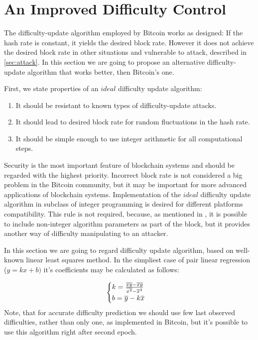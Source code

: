 \documentclass[number,preprint,review]{elsarticle}
\begin{document}
\section{An Improved Difficulty Control}
\label{sec:improved}

The difficulty-update algorithm employed by Bitcoin works as designed: If the hash rate is constant, it yields the desired block rate.
However it does not achieve the desired block rate in other situations and vulnerable to attack, described in \ref{sec:attack}.
In this section we are going to propose an alternative difficulty-update algorithm that works better, then Bitcoin's one.

First, we state properties of an \(ideal\) difficulty update algorithm:
\begin{enumerate}
\item{It should be resistant to known types of difficulty-update attacks.}
\item{It should lead to desired block rate for random fluctuations in the hash rate.}
\item{It should be simple enough to use integer arithmetic for all computational steps.}
\end{enumerate}
Security is the most important feature of blockchain systems and should be regarded with the highest priority.
Incorrect block rate is not considered a big problem in the Bitcoin community, but it may be important for more advanced applications of blockchain systems.
Implementation of the \(ideal\) difficulty update algorithm in subclass of integer programming is desired for different platforms compatibility.
This rule is not required, because, as mentioned in \cite{kraft2015difficulty}, it is possible to include non-integer algorithm parameters as part of the block, but it provides another way of difficulty manipulating to an attacker.

In this section we are going to regard difficulty update algorithm, based on well-known linear least squares method\cite{lawson1974solving}.
In the simpliest case of pair linear regression (\(y=kx+b)\) it's coefficients may be calculated as follows:

\begin{equation}
  \begin{cases}
    k= {{\overline{xy} - \overline{x}\overline{y}} \over {\overline{x^2} - \overline{x}^2}}  \\
    b=\overline{y}-k\overline{x}
  \end{cases}
\end{equation}
Note, that for accurate difficulty prediction we should use few last observed difficulties, rather than only one, as implemented in Bitcoin, but it's possible to use this algorithm right after second epoch.
\end{document}
